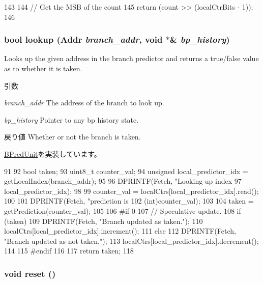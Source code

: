 \begin{DoxyCode}
143 {
144     // Get the MSB of the count
145     return (count >> (localCtrBits - 1));
146 }
\end{DoxyCode}
\hypertarget{classLocalBP_a9c30d728e49473b5a3825835e98a10bc}{
\subsubsection[{lookup}]{\setlength{\rightskip}{0pt plus 5cm}bool lookup ({\bf Addr} {\em branch\_\-addr}, \/  void $\ast$\& {\em bp\_\-history})}}
\label{classLocalBP_a9c30d728e49473b5a3825835e98a10bc}
Looks up the given address in the branch predictor and returns a true/false value as to whether it is taken. 
\begin{DoxyParams}{引数}
\item[{\em branch\_\-addr}]The address of the branch to look up. \item[{\em bp\_\-history}]Pointer to any bp history state. \end{DoxyParams}
\begin{DoxyReturn}{戻り値}
Whether or not the branch is taken. 
\end{DoxyReturn}


\hyperlink{classBPredUnit_a5632fdea0abc34f7d68d8445a7a6c166}{BPredUnit}を実装しています。


\begin{DoxyCode}
91 {
92     bool taken;
93     uint8_t counter_val;
94     unsigned local_predictor_idx = getLocalIndex(branch_addr);
95 
96     DPRINTF(Fetch, "Looking up index %
97             local_predictor_idx);
98 
99     counter_val = localCtrs[local_predictor_idx].read();
100 
101     DPRINTF(Fetch, "prediction is %
102             (int)counter_val);
103 
104     taken = getPrediction(counter_val);
105 
106 #if 0
107     // Speculative update.
108     if (taken) {
109         DPRINTF(Fetch, "Branch updated as taken.\n");
110         localCtrs[local_predictor_idx].increment();
111     } else {
112         DPRINTF(Fetch, "Branch updated as not taken.\n");
113         localCtrs[local_predictor_idx].decrement();
114     }
115 #endif
116 
117     return taken;
118 }
\end{DoxyCode}
\hypertarget{classLocalBP_ad20897c5c8bd47f5d4005989bead0e55}{
\subsubsection[{reset}]{\setlength{\rightskip}{0pt plus 5cm}void reset ()}}
\label{classLocalBP_ad20897c5c8bd47f5d4005989bead0e55}



